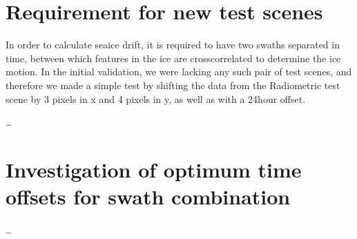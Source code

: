 \documentclass[letterpaper,10pt,english]{jupyterBook}
\begin{document}
\section{Requirement for new test scenes}
\label{\detokenize{roadmap_for_future_atbd_developments:requirement-for-new-test-scenes}}
\sphinxAtStartPar
In order to calculate sea\sphinxhyphen{}ice drift, it is required to have two swaths
separated in time, between which features in the ice are cross\sphinxhyphen{}correlated
to determine the ice motion. In the initial validation, we were lacking any
such pair of test scenes, and therefore we made a simple test by shifting
the data from the Radiometric test scene by 3 pixels in x and 4 pixels in
y, as well as with a 24\sphinxhyphen{}hour offset.

\sphinxAtStartPar
…


\section{Investigation of optimum time offsets for swath combination}
\label{\detokenize{roadmap_for_future_atbd_developments:investigation-of-optimum-time-offsets-for-swath-combination}}
\sphinxAtStartPar
…

\sphinxstepscope
\end{document}
